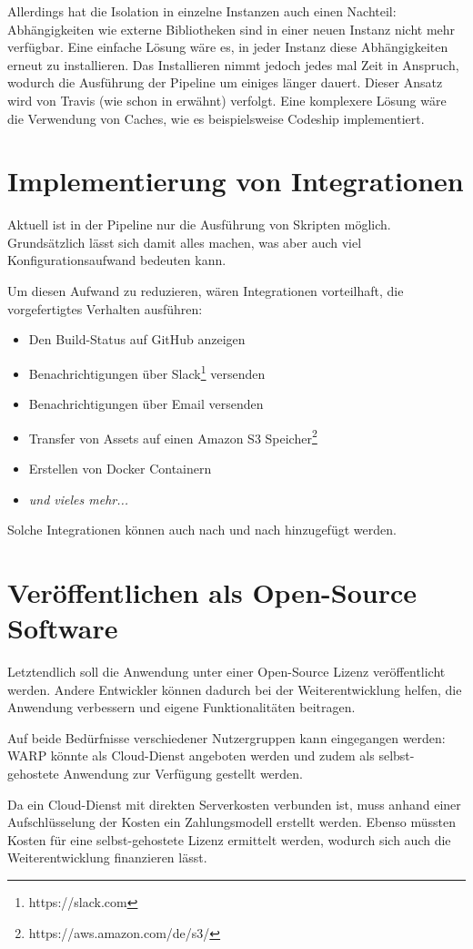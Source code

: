 Allerdings hat die Isolation in einzelne Instanzen auch einen Nachteil: Ab\-häng\-ig\-kei\-ten wie externe Bibliotheken sind in einer neuen Instanz nicht mehr verfügbar. Eine einfache Lösung wäre es, in jeder Instanz diese Abhängigkeiten erneut zu installieren. Das Installieren nimmt jedoch jedes mal Zeit in Anspruch, wodurch die Ausführung der Pipeline um einiges länger dauert. Dieser Ansatz wird von Travis (wie schon in  erwähnt) verfolgt. Eine komplexere Lösung wäre die Verwendung von Caches, wie es beispielsweise Codeship implementiert.


\section{Implementierung von Integrationen}

Aktuell ist in der Pipeline nur die Ausführung von Skripten möglich. Grundsätzlich lässt sich damit alles machen, was aber auch viel Konfigurationsaufwand bedeuten kann.

Um diesen Aufwand zu reduzieren, wären Integrationen vorteilhaft, die vorgefertigtes Verhalten ausführen:

\begin{itemize}
  \item Den Build-Status auf GitHub anzeigen
  \item Benachrichtigungen über Slack\footnote{https://slack.com} versenden
  \item Benachrichtigungen über Email versenden
  \item Transfer von Assets auf einen Amazon S3 Speicher\footnote{https://aws.amazon.com/de/s3/}
  \item Erstellen von Docker Containern
  \item \emph{und vieles mehr...}
\end{itemize}

Solche Integrationen können auch nach und nach hinzugefügt werden.

\section{Veröffentlichen als Open-Source Software}

Letztendlich soll die Anwendung unter einer Open-Source Lizenz veröffentlicht werden. Andere Entwickler können dadurch bei der Weiterentwicklung helfen, die Anwendung verbessern und eigene Funktionalitäten beitragen.

Auf beide Bedürfnisse verschiedener Nutzergruppen kann eingegangen werden: WARP könnte als Cloud-Dienst angeboten werden und zudem als selbst-gehostete Anwendung zur Verfügung gestellt werden.

Da ein Cloud-Dienst mit direkten Serverkosten verbunden ist, muss anhand einer Aufschlüsselung der Kosten ein Zahlungsmodell erstellt werden. Ebenso müssten Kosten für eine selbst-gehostete Lizenz ermittelt werden, wodurch sich auch die Weiterentwicklung finanzieren lässt.
